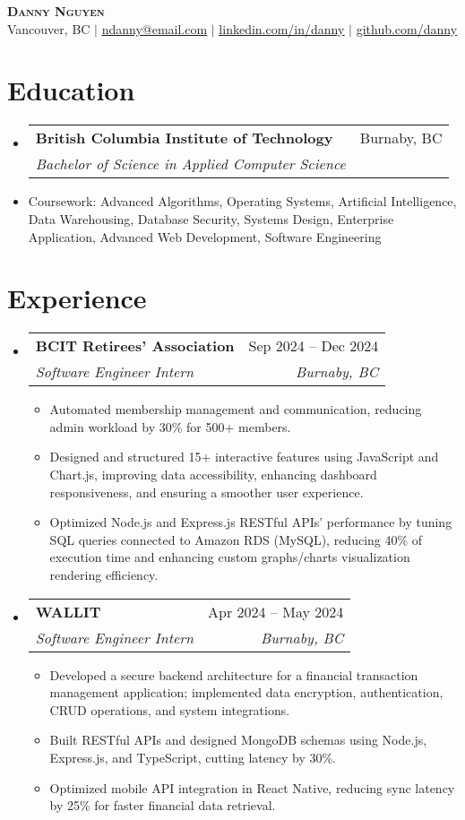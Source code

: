 \documentclass[letterpaper,11pt]{article}
\makeatletter
\newcommand{\resumeItem}[1]{
\item\small{
{#1 \vspace{-2pt}}
}
}
\newcommand{\resumeSubheading}[4]{
\vspace{-2pt}\item
\begin{tabular*}{0.97\textwidth}[t]{l@{\extracolsep{\fill}}r}
\textbf{#1} & #2 \\
\textit{\small#3} & \textit{\small #4} \\
\end{tabular*}\vspace{-7pt}
}
\newcommand{\resumeSubHeadingListStart}{\begin{itemize}[leftmargin=0.15in, label={}]}
\newcommand{\resumeSubHeadingListEnd}{\end{itemize}}
\newcommand{\resumeItemListStart}{\begin{itemize}}
\newcommand{\resumeItemListEnd}{\end{itemize}\vspace{-5pt}}
\makeatother
\begin{document}
\begin{center}
\textbf{\Huge \scshape Danny Nguyen} \\ \vspace{1pt}
\small Vancouver, BC $|$ \href{mailto:ndanny@email.com}{\underline{ndanny@email.com}} $|$
\href{https://linkedin.com/in/danny}{\underline{linkedin.com/in/danny}} $|$
\href{https://github.com/danny}{\underline{github.com/danny}}
\end{center}



\section{Education}
\resumeSubHeadingListStart
\resumeSubheading{British Columbia Institute of Technology}{Burnaby, BC}{Bachelor of Science in Applied Computer Science}{ }
\resumeItem{Coursework: Advanced Algorithms, Operating Systems, Artificial Intelligence, Data Warehousing, Database Security, Systems Design, Enterprise Application, Advanced Web Development, Software Engineering}
\resumeSubHeadingListEnd

\section{Experience}
\resumeSubHeadingListStart
\resumeSubheading{BCIT Retirees’ Association}{Sep 2024 – Dec 2024}{Software Engineer Intern}{Burnaby, BC}
\resumeItemListStart
\resumeItem{Automated membership management and communication, reducing admin workload by 30\% for 500+ members.}
\resumeItem{Designed and structured 15+ interactive features using JavaScript and Chart.js, improving data accessibility, enhancing dashboard responsiveness, and ensuring a smoother user experience.}
\resumeItem{Optimized Node.js and Express.js RESTful APIs’ performance by tuning SQL queries connected to Amazon RDS (MySQL), reducing 40\% of execution time and enhancing custom graphs/charts visualization rendering efficiency.}
\resumeItemListEnd

\resumeSubheading{WALLIT}{Apr 2024 – May 2024}{Software Engineer Intern}{Burnaby, BC}
\resumeItemListStart
\resumeItem{Developed a secure backend architecture for a financial transaction management application; implemented data encryption, authentication, CRUD operations, and system integrations.}
\resumeItem{Built RESTful APIs and designed MongoDB schemas using Node.js, Express.js, and TypeScript, cutting latency by 30\%.}
\resumeItem{Optimized mobile API integration in React Native, reducing sync latency by 25\% for faster financial data retrieval.}
\resumeItemListEnd
\resumeSubHeadingListEnd
\end{document}
